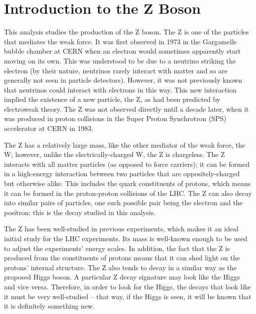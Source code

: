 


\section{Introduction to the Z Boson}
This analysis studies the production of the Z boson.  
The Z is one of the particles that mediates the weak force.  
It was first observed in 1973 in the Gargamelle bubble chamber at CERN %
when an electron would sometimes apparently start moving on its own.  
This was understood to be due to a neutrino striking the electron 
(by their nature, neutrinos rarely interact with matter and so are generally 
not seen in particle detectors).  
However, it was not previously known that neutrinos could interact 
with electrons in this way.  
This new interaction implied the existence of a new particle, the Z, 
as had been predicted by electroweak theory.  
The Z was not observed directly until a decade later, 
when it was produced in proton collisions in the 
Super Proton Synchrotron (SPS) accelerator at CERN in 1983.  

The Z has a relatively large mass, 
like the other mediator of the weak force, the W; 
however, unlike the electrically-charged W, the Z is chargeless.  
The Z interacts with all matter particles (as opposed to force carriers); 
it can be formed in a high-energy interaction between 
two particles that are oppositely-charged but otherwise alike.  
This includes the quark constituents of protons, 
which means it can be formed in the proton-proton collisions 
of the LHC.  
The Z can also decay into similar pairs of particles, 
one such possible pair being the electron and the positron; 
this is the decay studied in this analysis.  

The Z has been well-studied in previous experiments, 
which makes it an ideal initial study for the LHC experiments.  
Its mass is well-known enough to be used to 
adjust the experiments' energy scales.  
In addition, the fact that the Z is produced from the 
constituents of protons 
means that it can shed light on the protons' internal structure.   
The Z also tends to decay in a similar way as the 
proposed Higgs boson. %
A particular Z decay signature may 
look like the Higgs and vice versa.  
Therefore, in order to look for the Higgs, 
the decays that look like it must be very well-studied -- 
that way, if the Higgs is seen, 
it will be known that it is definitely something new.  



